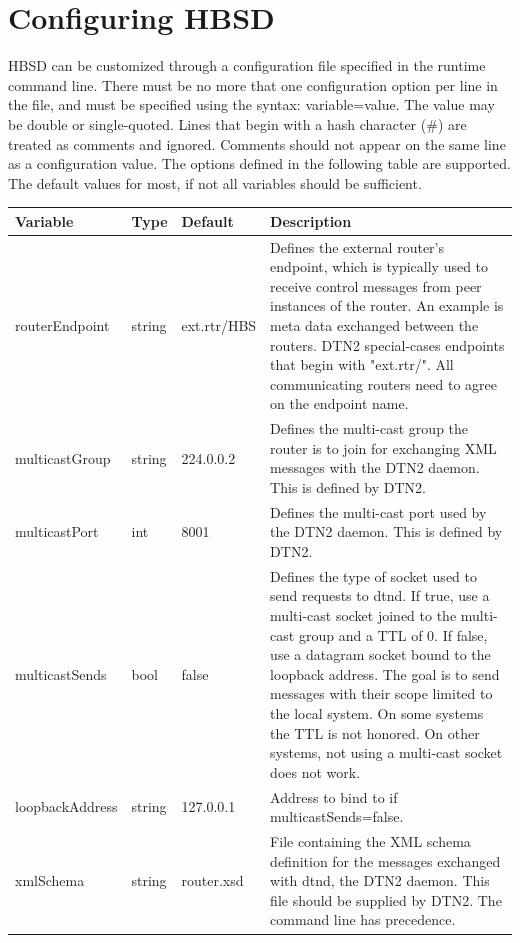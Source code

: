 \section{Configuring HBSD}

HBSD can be customized through a configuration file specified in the runtime command line.  
There must be no more that one configuration option per line in the file, and must be specified using the syntax: variable=value. The value may be double or single-quoted. Lines that begin with a hash character ($\#$) are treated as comments and ignored. Comments should not appear on the same line as a configuration value. The options defined in the following table are supported. The default values for most, if not all variables should be sufficient.

\begin{longtable}[!h]{|p{4cm}|p{1cm}|p{2cm}|p{5cm}|}
\hline
\textbf{Variable}& \textbf{Type} & \textbf{Default} & \textbf{Description} \\
\hline
routerEndpoint &  string & ext.rtr/HBS & Defines the external router's endpoint, which is typically  used to receive control 
messages from peer  instances of the router. An 
example is meta data exchanged between the 
routers. DTN2 special-cases endpoints that begin with 
"ext.rtr/". All communicating routers need to agree on the  endpoint name.\\
\hline
multicastGroup & string &  224.0.0.2 & Defines the multi-cast group the router is to join for  exchanging XML messages 
with the DTN2 daemon. This is defined by DTN2.\\
\hline
multicastPort & int & 8001 & Defines the multi-cast port  used by the DTN2 daemon. This is defined by DTN2.\\
\hline
multicastSends & bool & false & Defines the type of socket used to send requests to
dtnd. If true, use a multi-cast socket joined to the multi-cast group and a TTL of 0. If false, use a datagram socket bound to the 
loopback address. The goal is to send messages with their scope limited to the 
local system. On some systems the TTL is not honored. On other systems, not using a multi-cast socket does not work. \\
\hline
loopbackAddress & string & 127.0.0.1 & Address to bind to if multicastSends=false.\\
\hline
xmlSchema & string  & router.xsd& File containing the XML schema definition for the 
messages exchanged with dtnd, the DTN2 daemon. This file should be supplied by DTN2. The command line has precedence.\\

\end{longtable}
